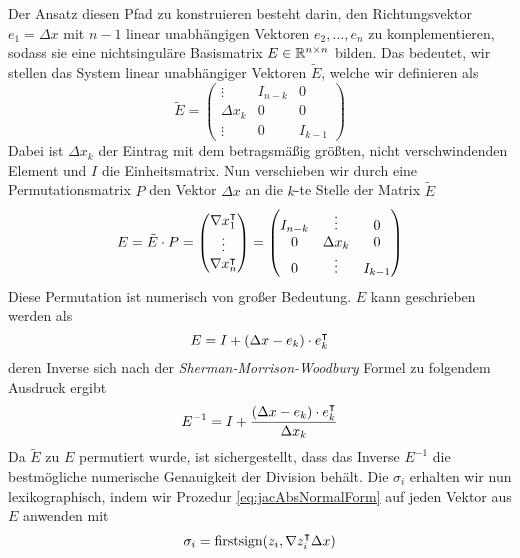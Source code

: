 Der Ansatz diesen Pfad zu konstruieren besteht darin, den Richtungsvektor $e_1 = \Delta x$ mit $n-1$ linear unabhängigen Vektoren $e_2,\ldots, e_n$ zu komplementieren, sodass sie eine nichtsinguläre Basismatrix $E\in \mathbb{R}^{n\times n}$ bilden.
Das bedeutet, wir stellen das System linear unabhängiger Vektoren $\tilde E$, welche wir definieren als
\[
\tilde E = 
 \begin{pmatrix}
  \vdots   & I_{n-k} & 0 \\
  \Delta x_k & 0&0\\
  \vdots   & 0&I_{k-1}
 \end{pmatrix}
\]
Dabei ist $\Delta x_k$ der Eintrag mit dem betragsmäßig größten, nicht verschwindenden Element und $I$ die Einheitsmatrix. Nun verschieben wir durch eine Permutationsmatrix $P$ den Vektor $\Delta x$ an die $k$-te Stelle der Matrix $\tilde E$
\[
E = \tilde E \cdot P=
\begin{pmatrix}
  \nabla x_1^\intercal\\
  \vdots\\
  \nabla x_n^\intercal\\
 \end{pmatrix}
 =
  \begin{pmatrix}
   I_{n-k} & \vdots &0\\
  0 & \Delta x_k & 0\\
    0 & \vdots&I_{k-1}
 \end{pmatrix}
\]
Diese Permutation ist numerisch von großer Bedeutung. $E$ kann geschrieben werden als
\[
  E = I + (\Delta x-e_k)\cdot e_k^\intercal 
\] 
deren Inverse sich nach der \textit{Sherman-Morrison-Woodbury} Formel zu folgendem Ausdruck ergibt 
\[
 E^{-1} = I + \frac{(\Delta x-e_k)\cdot e_k^\intercal}{\Delta x_k}
\]
Da $\tilde E$ zu $E$ permutiert wurde, ist sichergestellt, dass das Inverse $E^{-1}$ die bestmögliche numerische Genauigkeit der Division behält.
Die $\sigma_i$ erhalten wir nun lexikographisch, indem wir Prozedur \eqref{eq:jacAbsNormalForm} auf jeden Vektor aus $E$ anwenden mit 
\[
  \sigma_i = \text{firstsign}(z_i,\nabla z_i^\intercal\Delta x)
\]

